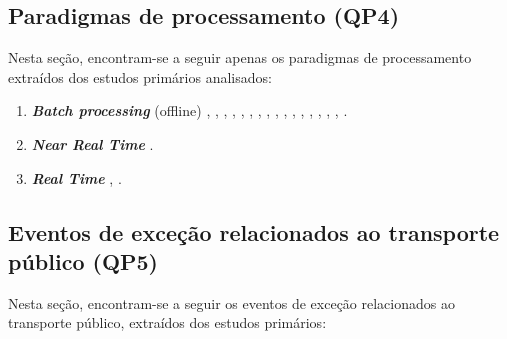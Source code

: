 \documentclass[
	12pt,				%
	oneside,			%
	a4paper,			%
	english,			%
	brazil				%
	]{abntex2ppgsi}
\begin{document}
\subsection{Paradigmas de processamento (QP4)}
Nesta seção, encontram-se a seguir apenas os paradigmas de processamento extraídos dos estudos primários analisados: 
\begin{enumerate}
\item \textit{\textbf{Batch processing}} (offline) \cite{Anantharam2015}, \cite{Wen2016}, \cite{Farseev2015}, \cite{Gutev2016}, \cite{Mata2015}, \cite{Chen2016}, \cite{Abbasi2015}, \cite{Bendler2014}, \cite{Bendler2014}, \cite{Yousaf2014}, \cite{Frias-Martinez2014}, \cite{Steiger2015Census}, \cite{Gal-Tzur2014}, \cite{Gkiotsalitis2016}, \cite{DiLorenzo2013}, \cite{Itoh2016}, \cite{Chaniotakis2015}.
\item \textit{\textbf{Near Real Time}} \cite{Mukherjee2015}.
\item \textit{\textbf{Real Time}} \cite{Soomro2016}, \cite{Lecue2014}.
\end{enumerate}

\subsection{Eventos de exceção relacionados ao transporte público (QP5)}
\label{qp5}

Nesta seção, encontram-se a seguir os eventos de exceção relacionados ao transporte público, extraídos dos estudos primários:
\end{document}
